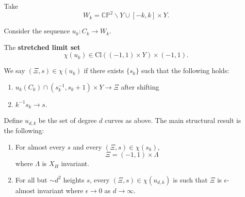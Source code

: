 Take
\[
W_k=\mathbb{CP}^2 \backslash Y \cup [-k,k]\times Y.
\]

Consider the sequence $u_k: C_k \to W_k$.

\begin{definition}

The \textbf{stretched limit set}
\[
\chi(u_k)\in \text{Cl}((-1,1)\times Y)\times (-1,1).
\]

We say $(\Xi, s)\in \chi(u_k)$ if there exists $\{s_k\}$ such that the following holds:

\begin{enumerate}
\item $u_k(C_k) \cap (s_k^{-1}, s_k +1) \times Y \to \Xi$ after shifting
\item $k^{-1}s_k \to s$.
\end{enumerate}

\end{definition}

Define $u_{d,k}$ be the set of degree $d$ curves as above. The main structural result is the following:

\begin{proposition}
\text{ }
\begin{enumerate}
\item For almost every $s$ and every $(\Xi, s) \in \chi(s_k)$,
    \[
    \Xi = (-1,1)\times \Lambda
    \]
    where $\Lambda$ is $X_H$ invariant.
\item For all but $\sim d^2$ heights $s$, every $(\Xi, s) \in \chi(u_{d,k})$ is such that $\Xi$ is $\epsilon$-almost invariant where $\epsilon\to 0$ as $d\to \infty$.
\end{enumerate}

\end{proposition}
